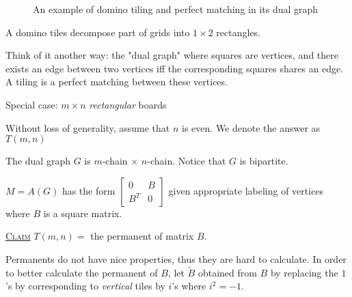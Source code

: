\documentclass{report}
\newcommand{\fancyem}[1]{\underline{\textsc{#1}}}
\theoremstyle{definition}
\theoremstyle{remark}
\numberwithin{equation}{section}
\begin{document}
\begin{figure}[h]
\label{fig:domino}
\caption{An example of domino tiling and perfect matching in its dual graph}
\end{figure}

A domino tiles decompose part of grids into $1 \times 2$ rectangles.

Think of it another way: the "dual graph" where squares are vertices, and there exists an edge between two vertices iff the corresponding squares shares an edge. A tiling is a perfect matching between these vertices. 

Special case: $m \times n$ \emph{rectangular} boards
\begin{figure}[h]
\centering
{}
\end{figure}

Without loss of generality, assume  that $n$ is even. We denote the answer as $T(m, n)$

The dual graph $G$ is $m$-chain $\times$ $n$-chain. Notice that $G$ is bipartite.

$M = A(G)$ has the form $\begin{bmatrix}
0 & B \\ B^T & 0
\end{bmatrix}$ given appropriate labeling of vertices where $B$ is a square matrix.

\fancyem{Claim} $T(m, n) =$ the permanent of matrix $B.$

Permanents do not have nice properties, thus they are hard to calculate. In order to better calculate the permanent of $B$, let $\tilde{B}$ obtained from $B$ by replacing the $1$'s by corresponding to \emph{vertical} tiles by $i$'s where $i^2 = -1.$
\end{document}
